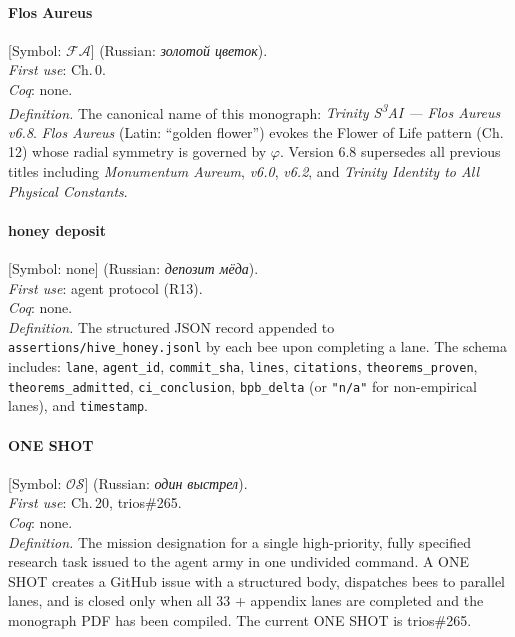 \paragraph*{\textmd{\textbf{Flos Aureus}}}
\label{entry:flos-aureus}
[Symbol: $\mathcal{FA}$] (Russian: \textit{золотой цветок}).\\
\textit{First use}: Ch.\,0.\\
\textit{Coq}: none.\\
\textit{Definition.}
The canonical name of this monograph: \emph{Trinity S\textsuperscript{3}AI
--- Flos Aureus v6.8}.
\emph{Flos Aureus} (Latin: ``golden flower'') evokes the Flower of Life
pattern (Ch.\,12) whose radial symmetry is governed by $\varphi$.
Version 6.8 supersedes all previous titles including
\emph{Monumentum Aureum}, \emph{v6.0}, \emph{v6.2}, and
\emph{Trinity Identity to All Physical Constants}.

\paragraph*{\textmd{\textbf{honey deposit}}}
\label{entry:honey}
[Symbol: none] (Russian: \textit{депозит мёда}).\\
\textit{First use}: agent protocol (R13).\\
\textit{Coq}: none.\\
\textit{Definition.}
The structured JSON record appended to
\texttt{assertions/hive\_honey.jsonl} by each bee upon completing a
lane.
The schema includes: \texttt{lane}, \texttt{agent\_id},
\texttt{commit\_sha}, \texttt{lines}, \texttt{citations},
\texttt{theorems\_proven}, \texttt{theorems\_admitted},
\texttt{ci\_conclusion}, \texttt{bpb\_delta} (or \texttt{"n/a"} for
non-empirical lanes), and \texttt{timestamp}.

\paragraph*{\textmd{\textbf{ONE SHOT}}}
\label{entry:one-shot}
[Symbol: $\mathcal{OS}$] (Russian: \textit{один выстрел}).\\
\textit{First use}: Ch.\,20, trios\#265.\\
\textit{Coq}: none.\\
\textit{Definition.}
The mission designation for a single high-priority, fully specified
research task issued to the agent army in one undivided command.
A ONE SHOT creates a GitHub issue with a structured body, dispatches
bees to parallel lanes, and is closed only when all 33 + appendix
lanes are completed and the monograph PDF has been compiled.
The current ONE SHOT is trios\#265.


